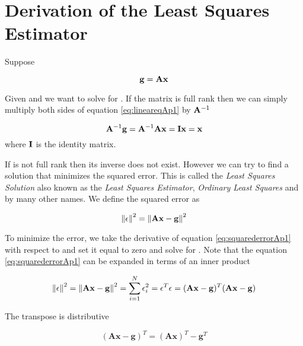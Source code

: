 \chapter{Derivation of the Least Squares Estimator}\label{app:Derivation of the Least Squares Estimator}

Suppose 

\begin{equation}\label{eq:lineareqAp1}
	\mathbf{g} = \mathbf{A}\mathbf{x} 
\end{equation}

Given  and  we want to solve for . If the matrix is full rank then we can simply multiply both sides of equation \ref{eq:lineareqAp1} by $\mathbf{A}^{-1}$ 

\begin{equation}
	\mathbf{A}^{-1} \mathbf{g} = \mathbf{A}^{-1}  \mathbf{Ax} = \mathbf{I} \mathbf{x} = \mathbf{x}
\end{equation}
where $\mathbf{I}$ is the identity matrix.

If  is not full rank then its inverse does not exist. However we can try to find a solution  that minimizes the squared error. This is called the \emph{Least Squares Solution} also known as the \emph{Least Squares Estimator}, \emph{Ordinary Least Squares} and by many other names. We define the squared error as

\begin{equation}\label{eq:squarederrorAp1}
	\mathbf{ \lVert \mathbf{\epsilon} \rVert }^2 =    \mathbf{ \lVert \mathbf{Ax-g} \rVert }^2
\end{equation}

\noindent To minimize the error, we take the derivative of equation \ref{eq:squarederrorAp1} with respect to  and set it equal to zero and solve for . Note that the equation \ref{eq:squarederrorAp1} can be expanded in terms of an inner product 

\begin{equation} \label{eq:squarederrorAp2}
	\mathbf{ \lVert \mathbf{\epsilon} \rVert }^2 =    \mathbf{ \lVert \mathbf{Ax-g} \rVert }^2 = \sum_{i=1}^{N} \epsilon_i^{2} = \mathbf{\epsilon}^T \mathbf{\epsilon} =(\mathbf{Ax-g} ) ^{T} ( \mathbf{Ax-g} )
\end{equation}

\noindent The transpose is distributive 

\begin{equation}
	 ( \mathbf{Ax-g} )^{T} = ( \mathbf{Ax} )^{T} - \mathbf{g}^{T} 
\end{equation}

